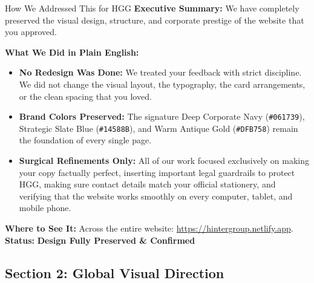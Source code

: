 \documentclass[11pt,a4paper]{article}
\begin{document}
\begin{DetailedResolutionBox}{How We Addressed This for HGG}
\textbf{Executive Summary:} We have completely preserved the visual design, structure, and corporate prestige of the website that you approved.

\textbf{What We Did in Plain English:}
\begin{itemize}
    \item \textbf{No Redesign Was Done:} We treated your feedback with strict discipline. We did not change the visual layout, the typography, the card arrangements, or the clean spacing that you loved.
    \item \textbf{Brand Colors Preserved:} The signature Deep Corporate Navy (\texttt{\#061739}), Strategic Slate Blue (\texttt{\#14588B}), and Warm Antique Gold (\texttt{\#DFB758}) remain the foundation of every single page.
    \item \textbf{Surgical Refinements Only:} All of our work focused exclusively on making your copy factually perfect, inserting important legal guardrails to protect HGG, making sure contact details match your official stationery, and verifying that the website works smoothly on every computer, tablet, and mobile phone.
\end{itemize}

\textbf{Where to See It:} Across the entire website: \url{https://hintergroup.netlify.app}. \\
\textbf{Status:} \textcolor{HGGGreen}{\textbf{Design Fully Preserved \& Confirmed}}
\end{DetailedResolutionBox}

\vspace{0.3cm}

\subsection{Section 2: Global Visual Direction}
\end{document}

